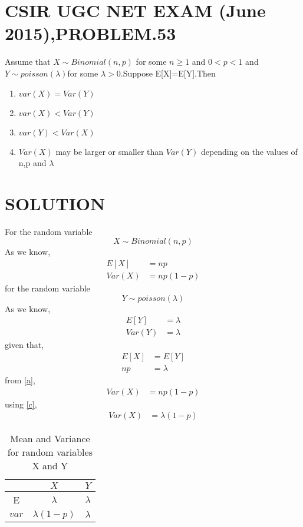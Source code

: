 \documentclass[journal,12pt,twocolumn]{IEEEtran}
\begin{document}
\section{CSIR UGC NET EXAM (June 2015),PROBLEM.53}
Assume that $X\sim Binomial(n, p)$ for some $n\geq 1$ and $0<p<1$
and $Y\sim poisson(\lambda)$for some $\lambda > 0$.Suppose E[X]=E[Y].Then
\begin{enumerate}
    \item $var(X)=Var(Y)$\\
    \item $var(X)<Var(Y)$\\
    \item $var(Y)<Var(X)$\\
    \item $Var(X)$ may be larger or smaller than $Var(Y)$ depending on the values of n,p and $\lambda$
\end{enumerate}
\section{SOLUTION}
For the random variable $$X\sim Binomial(n, p)$$
As we know,
\begin{align}
E[X]&=np\\
Var(X)&=np(1-p) \label{a}
\end{align}
for the random variable $$Y\sim poisson(\lambda)$$
As we know,
\begin{align}
E[Y]&=\lambda\\
Var(Y)&=\lambda \label{b}
\end{align}
given that,
\begin{align}
E[X]&=E[Y]\\
np&=\lambda \label{c}
\end{align}
from \eqref{a},
\begin{align}
Var(X)&=np(1-p)
\end{align}
using \eqref{c},
\begin{align}
Var(X)&=\lambda(1-p)
\end{align}
\begin{table}[ht]
\caption{Mean and Variance for random variables X and Y}
\begin{center}
    \begin{tabular}{|c|c|c|}
    \hline
     & $X$&$Y$\\
    \hline
    E& $\lambda$& $\lambda$\\
    \hline
     $var$& $\lambda(1-p)$ & $\lambda$\\
    \hline
    \end{tabular}
\end{center} 
\label{tab:1}
\end{table}
\end{document}
